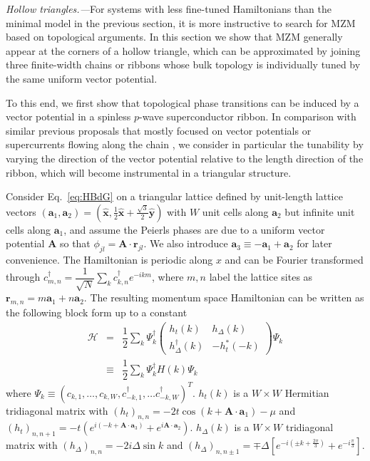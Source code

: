 \documentclass[aps,prb,showpacs,amsmath,twocolumn,amssymb,superscriptaddress]{revtex4-2}
\let\oldhat\hat
\renewcommand{\hat}[1]{\oldhat{\mathbf{#1}}}
\newcommand{\ham}{\mathcal{H}}
\newcommand{\cc}{c^{\dagger}}
\newcommand{\de}{\Delta}
\begin{document}
\emph{Hollow triangles.---}For systems with less fine-tuned Hamiltonians than the minimal model in the previous section, it is more instructive to search for MZM based on topological arguments. In this section we show that MZM generally appear at the corners of a hollow triangle, which can be approximated by joining three finite-width chains or ribbons whose bulk topology is individually tuned by the same uniform vector potential.

To this end, we first show that topological phase transitions can be induced by a vector potential in a spinless $p$-wave superconductor ribbon. In comparison with similar previous proposals that mostly focused on vector potentials or supercurrents flowing along the chain \cite{romitoManipulatingMajoranaFermions2012, takasanSupercurrentinducedTopologicalPhase2022}, we consider in particular the tunability by varying the direction of the vector potential relative to the length direction of the ribbon, which will become instrumental in a triangular structure.

Consider Eq.~\eqref{eq:HBdG} on a triangular lattice defined by unit-length lattice vectors $(\mathbf a_1, \mathbf a_2) = (\hat{x}, \frac{1}{2}\hat{x} + \frac{\sqrt{3}}{2}\hat{y})$ with $W$ unit cells along $\mathbf a_2$ but infinite unit cells along $\mathbf a_1$, and assume the Peierls phases are due to a uniform vector potential $\mathbf A$ so that $\phi_{jl} = \mathbf A\cdot \mathbf r_{jl}$. We also introduce $\mathbf a_3 \equiv -\mathbf a_1 + \mathbf a_2$ for later convenience. The Hamiltonian is periodic along $x$ and can be Fourier transformed through $\cc_{m,n} = \dfrac{1}{\sqrt{N}} \sum_{k} \cc_{k,n} e^{-i km}$, where $m,n$ label the lattice sites as $\mathbf r_{m,n} = m\mathbf a_1 + n \mathbf a_2$. The resulting momentum space Hamiltonian can be written as the following block form up to a constant
\begin{eqnarray}\label{eq:Hribbon}
      \ham &=& \dfrac{1}{2} \sum_k \Psi_k^\dagger \left(
    \begin{matrix}
      h_t(k) & h_\Delta(k) \\
      h_\Delta^\dagger(k) & -h_t^*(-k)
    \end{matrix} \right)
    \Psi_k \\\nonumber
&\equiv&\dfrac{1}{2} \sum_k \Psi_k^\dagger H(k)
    \Psi_k
\end{eqnarray}
where $\Psi_k \equiv (c_{k,1},\dots, c_{k,W},c^\dag_{-k,1},\dots c_{-k,W}^\dag)^T$. $h_t(k)$ is a $W\times W$ Hermitian tridiagonal matrix with $(h_t)_{n,n} = -2t\cos(k+\mathbf A\cdot \mathbf a_1) - \mu$ and $(h_t)_{n,n+1} = -t\left( e^{i(-k+\mathbf A\cdot \mathbf a_3)}  + e^{i\mathbf A \cdot \mathbf a_2}\right)$. $h_\Delta(k)$ is a $W\times W$ tridiagonal matrix with $(h_\Delta)_{n,n} = -2i\de \sin k $ and $(h_\Delta)_{n,n\pm 1} = \mp \de\left[ e^{-i(\pm k + \frac{2\pi}{3})} + e^{-i\frac{\pi}{3}} \right]$.
\end{document}
